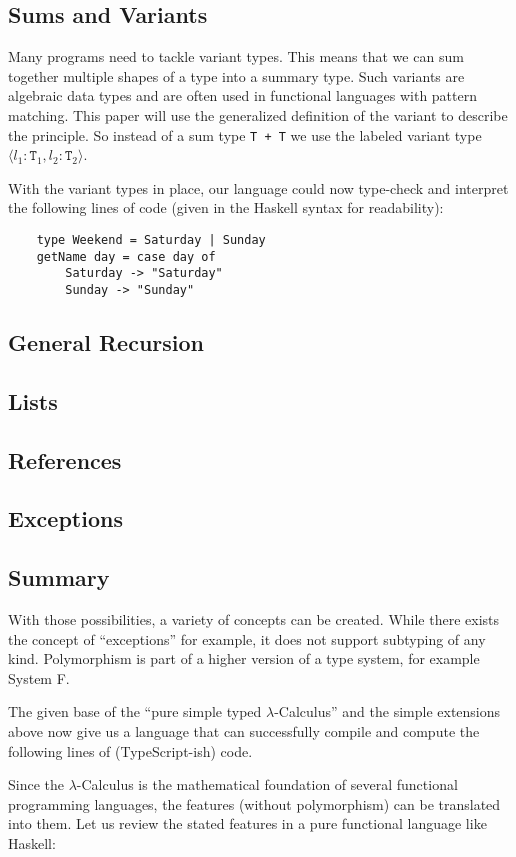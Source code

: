 \subsection{Sums and Variants}

Many programs need to tackle variant types. This means
that we can sum together multiple shapes of a type into a summary
type. Such variants are algebraic data types and are often used in functional
languages with pattern matching. This paper will use the generalized definition
of the variant to describe the principle. So instead of a sum type \texttt{T + T}
we use the labeled variant type $\langle l_1 \colon \texttt{T}_1, l_2 \colon \texttt{T}_2 \rangle$.



With the variant types in place, our language could now type-check and interpret
the following lines of code (given in the Haskell syntax for readability):

\begin{verbatim}
    type Weekend = Saturday | Sunday
    getName day = case day of
        Saturday -> "Saturday"
        Sunday -> "Sunday"
\end{verbatim}

\subsection{General Recursion}
\subsection{Lists}
\subsection{References}
\subsection{Exceptions}
\subsection{Summary}

With those possibilities, a variety of concepts can be created.
While there exists the concept of ``exceptions'' for example, it does
not support subtyping of any kind. Polymorphism is part of a higher
version of a type system, for example System F.


The given base of the ``pure simple typed $\lambda$-Calculus'' and
the simple extensions above now give us a language that can successfully compile
and compute the following lines of (TypeScript-ish) code.


Since the $\lambda$-Calculus is the mathematical foundation of several functional
programming languages, the features (without polymorphism) can be translated
into them. Let us review the stated features in a pure functional language
like Haskell:

